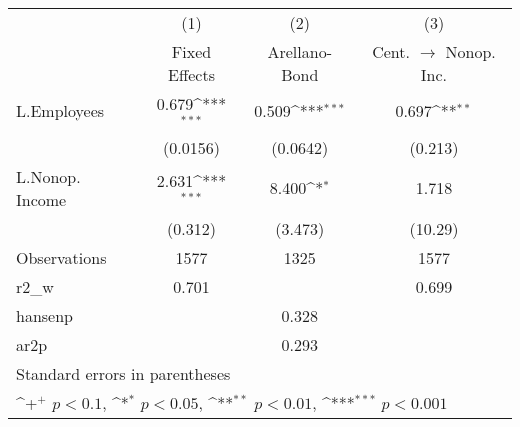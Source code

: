 {
\def\sym#1{\ifmmode^{#1}\else\(^{#1}\)\fi}
\begin{tabular}{l*{3}{c}}
\hline\hline
                    &\multicolumn{1}{c}{(1)}&\multicolumn{1}{c}{(2)}&\multicolumn{1}{c}{(3)}\\
                    &\multicolumn{1}{c}{Fixed Effects}&\multicolumn{1}{c}{Arellano-Bond}&\multicolumn{1}{c}{Cent. $\rightarrow$ Nonop. Inc.}\\
\hline
L.Employees         &       0.679\sym{***}&       0.509\sym{***}&       0.697\sym{**} \\
                    &    (0.0156)         &    (0.0642)         &     (0.213)         \\
L.Nonop. Income     &       2.631\sym{***}&       8.400\sym{*}  &       1.718         \\
                    &     (0.312)         &     (3.473)         &     (10.29)         \\
\hline
Observations        &        1577         &        1325         &        1577         \\
r2\_w                &       0.701         &                     &       0.699         \\
hansenp             &                     &       0.328         &                     \\
ar2p                &                     &       0.293         &                     \\
\hline\hline
\multicolumn{4}{l}{\footnotesize Standard errors in parentheses}\\
\multicolumn{4}{l}{\footnotesize \sym{+} \(p<0.1\), \sym{*} \(p<0.05\), \sym{**} \(p<0.01\), \sym{***} \(p<0.001\)}\\
\end{tabular}
}

